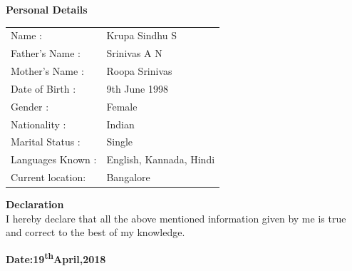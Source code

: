 \documentclass[letterpaper,11pt,oneside]{article}
\begin{document}
\begin{flushleft}	
	\vspace{2ex}
	\textbf{{\normalsize  Personal Details\\}}
	\vspace{2ex}
	
	\begin{tabular}{l l}
		Name			:  & Krupa Sindhu S\\
		Father’s Name   :  &Srinivas A N\\ 
		Mother’s Name   :  &Roopa Srinivas\\
		Date of Birth	:  &9th June 1998\\
		Gender			:  &Female\\
		Nationality		:  &Indian\\
		Marital Status 	:  &Single\\
		Languages Known	:  &English, Kannada, Hindi\\
		Current location:  &Bangalore\\
	\end{tabular}

\vspace{2ex}
\textbf{{\large Declaration\\}}
\vspace{2ex}
I hereby declare that all the above mentioned information given by me is true and correct to the best of my knowledge.\\

\vspace{2ex}

\textbf{\normalsize{Date:19\textsuperscript{th}April,2018}}
\end{flushleft}
\end{document}
